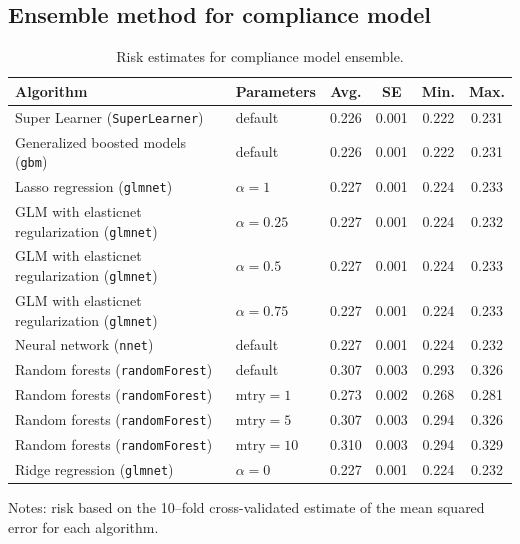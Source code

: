 \documentclass[12pt]{article}
\begin{document}
\begin{singlespace}		%




\pagebreak
\begin{appendices}

\section{Ensemble method for compliance model}

\begin{table}[ht]
\begin{center}
\caption{Risk estimates for compliance model ensemble.} 
\begin{tabular}{llcccc}
  \hline
 Algorithm & Parameters & Avg. & SE & Min. & Max. \\ 
  \hline
        \rowcolor{Gray}
Super Learner (\texttt{SuperLearner}) & default & 0.226 & 0.001 & 0.222 & 0.231 \\
Generalized boosted models (\texttt{gbm}) & default & 0.226 & 0.001 & 0.222 &  0.231 \\ 
Lasso regression (\texttt{glmnet})  & $\alpha=1$ & 0.227 & 0.001 & 0.224 & 0.233 \\ 
GLM with elasticnet regularization (\texttt{glmnet}) &  $\alpha=0.25$ & 0.227 & 0.001 & 0.224 & 0.232 \\ 
GLM with elasticnet regularization (\texttt{glmnet}) &  $\alpha=0.5$ & 0.227 & 0.001 & 0.224 & 0.233 \\ 
GLM with elasticnet regularization (\texttt{glmnet}) &  $\alpha=0.75$ & 0.227 & 0.001 & 0.224 & 0.233 \\ 
Neural network (\texttt{nnet}) &  default & 0.227 & 0.001 & 0.224 & 0.232 \\ 
Random forests (\texttt{randomForest}) & default & 0.307 & 0.003 & 0.293 & 0.326  \\  
Random forests (\texttt{randomForest})  & $\mathrm{mtry}=1$ & 0.273 & 0.002 & 0.268 & 0.281 \\ 
Random forests (\texttt{randomForest})  & $\mathrm{mtry}=5$  & 0.307 & 0.003 & 0.294 & 0.326 \\  
Random forests (\texttt{randomForest})  & $\mathrm{mtry}=10$ & 0.310 & 0.003 & 0.294 & 0.329 \\ 
Ridge regression (\texttt{glmnet}) &  $\alpha=0$ & 0.227 & 0.001 & 0.224 & 0.232 \\ 
   \hline
\end{tabular} 
\end{center}
\footnotesize{Notes: risk based on the 10--fold cross-validated estimate of the mean squared error for each algorithm.}
\label{reponse-ensemble}
\end{table}


\end{appendices}
\end{singlespace}
\end{document}
